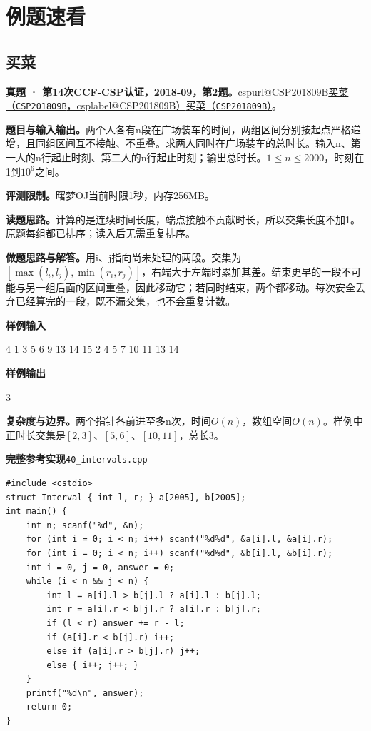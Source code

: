 \documentclass[UTF8,11pt,a4paper,fontset=none]{ctexart}
\makeatletter
\newcommand{\csp}[2]{\ifcsname cspurl@#1\endcsname\href{\csname cspurl@#1\endcsname}{#2（\texttt{#1}，\csname csplabel@#1\endcsname）}\else\href{https://oj.shumeng.tech/p/#1}{#2（\texttt{#1}）}\fi}
\makeatother
\begin{document}
\section{例题速看}
\subsection{买菜}
\textbf{真题 · 第14次CCF-CSP认证，2018-09，第2题。}\csp{CSP201809B}{买菜}。

\noindent\textbf{题目与输入输出。}两个人各有n段在广场装车的时间，两组区间分别按起点严格递增，且同组区间互不接触、不重叠。求两人同时在广场装车的总时长。输入n、第一人的n行起止时刻、第二人的n行起止时刻；输出总时长。$1\le n\le2000$，时刻在1到$10^6$之间。

\noindent\textbf{评测限制。}曙梦OJ当前时限1秒，内存256MB。

\noindent\textbf{读题思路。}计算的是连续时间长度，端点接触不贡献时长，所以交集长度不加1。原题每组都已排序；读入后无需重复排序。

\noindent\textbf{做题思路与解答。}用i、j指向尚未处理的两段。交集为$[\max(l_i,l_j),\min(r_i,r_j)]$，右端大于左端时累加其差。结束更早的一段不可能与另一组后面的区间重叠，因此移动它；若同时结束，两个都移动。每次安全丢弃已经算完的一段，既不漏交集，也不会重复计数。
\begin{tcolorbox}[samplebox,title={输入输出样例}]
\textbf{样例输入}
\begin{Sample}
4
1 3
5 6
9 13
14 15
2 4
5 7
10 11
13 14
\end{Sample}
\tcblower
\textbf{样例输出}
\begin{Sample}
3
\end{Sample}
\end{tcolorbox}

\noindent\textbf{复杂度与边界。}两个指针各前进至多n次，时间$O(n)$，数组空间$O(n)$。样例中正时长交集是$[2,3]$、$[5,6]$、$[10,11]$，总长3。
\par\noindent\begin{minipage}{\linewidth}
\textbf{完整参考实现}\quad\texttt{40\_intervals.cpp}
\begin{lstlisting}
#include <cstdio>
struct Interval { int l, r; } a[2005], b[2005];
int main() {
    int n; scanf("%d", &n);
    for (int i = 0; i < n; i++) scanf("%d%d", &a[i].l, &a[i].r);
    for (int i = 0; i < n; i++) scanf("%d%d", &b[i].l, &b[i].r);
    int i = 0, j = 0, answer = 0;
    while (i < n && j < n) {
        int l = a[i].l > b[j].l ? a[i].l : b[j].l;
        int r = a[i].r < b[j].r ? a[i].r : b[j].r;
        if (l < r) answer += r - l;
        if (a[i].r < b[j].r) i++;
        else if (a[i].r > b[j].r) j++;
        else { i++; j++; }
    }
    printf("%d\n", answer);
    return 0;
}
\end{lstlisting}
\end{minipage}\par
\end{document}
